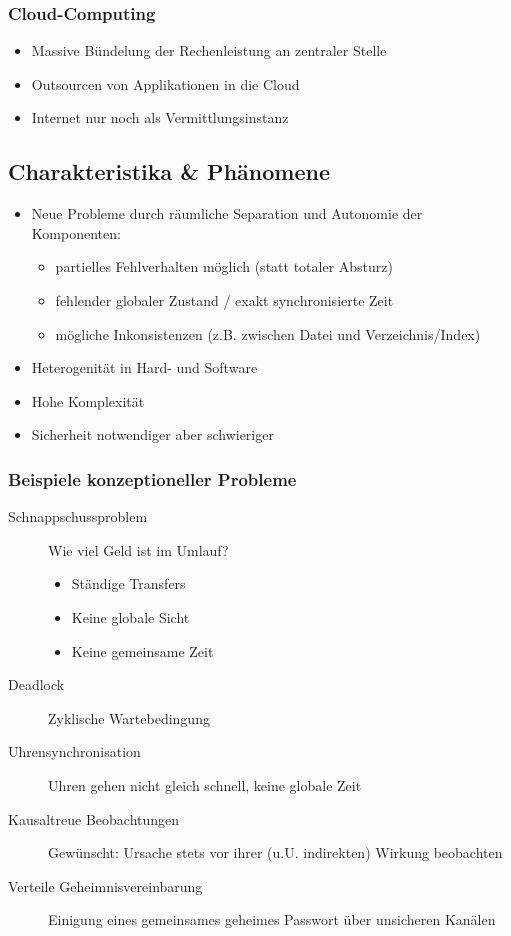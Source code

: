 \documentclass[10pt,a4paper]{article}
\begin{document}
\subsubsection{Cloud-Computing}
\begin{itemize}
\item Massive Bündelung der Rechenleistung an zentraler Stelle
\item Outsourcen von Applikationen in die Cloud
\item Internet nur noch als Vermittlungsinstanz
\end{itemize}


\subsection{Charakteristika \& Phänomene}
\begin{itemize}
\item Neue Probleme durch räumliche Separation und Autonomie der Komponenten:
\begin{itemize}
\item partielles Fehlverhalten möglich (statt totaler Absturz)
\item fehlender globaler Zustand / exakt synchronisierte Zeit
\item mögliche Inkonsistenzen (z.B. zwischen Datei und Verzeichnis/Index)
\end{itemize}
\item Heterogenität in Hard- und Software
\item Hohe Komplexität
\item Sicherheit notwendiger aber schwieriger
\end{itemize}

\subsubsection{Beispiele konzeptioneller Probleme}
\begin{description}
\item[Schnappschussproblem] Wie viel Geld ist im Umlauf?
\begin{itemize}
\item Ständige Transfers
\item Keine globale Sicht
\item Keine gemeinsame Zeit
\end{itemize}
\item[Deadlock] Zyklische Wartebedingung
\item[Uhrensynchronisation] Uhren gehen nicht gleich schnell, keine globale Zeit
\item[Kausaltreue Beobachtungen] Gewünscht:  Ursache stets vor ihrer (u.U. indirekten) Wirkung beobachten
\item[Verteile Geheimnisvereinbarung] Einigung eines gemeinsames geheimes Passwort über unsicheren Kanälen
\end{description}
\end{document}
